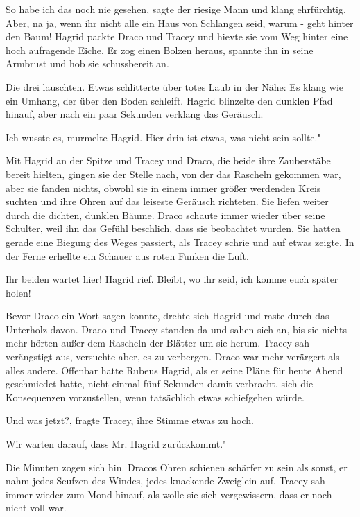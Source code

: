 \glqq So habe ich das noch nie gesehen\grqq{}, sagte der riesige Mann und klang
ehrfürchtig. \glqq Aber, na ja, wenn ihr nicht alle ein Haus von
Schlangen seid, warum - geht hinter den Baum!\grqq{} Hagrid packte Draco
und Tracey und hievte sie vom Weg hinter eine hoch aufragende Eiche. Er
zog einen Bolzen heraus, spannte ihn in seine Armbrust und hob sie
schussbereit an.

Die drei lauschten. Etwas schlitterte über totes Laub in der Nähe: Es klang wie
ein Umhang, der über den Boden schleift. Hagrid blinzelte den dunklen
Pfad hinauf, aber nach ein paar Sekunden verklang das Geräusch.

\glqq Ich wusste es\grqq{}, murmelte Hagrid. \glqq Hier drin ist etwas, was
nicht sein sollte."

Mit Hagrid an der Spitze und Tracey und Draco, die beide ihre Zauberstäbe bereit
hielten, gingen sie der Stelle nach, von der das Rascheln gekommen war,
aber sie fanden nichts, obwohl sie in einem immer größer werdenden Kreis
suchten und ihre Ohren auf das leiseste Geräusch richteten. Sie liefen
weiter durch die dichten, dunklen Bäume. Draco schaute immer wieder über
seine Schulter, weil ihn das Gefühl beschlich, dass sie beobachtet
wurden. Sie hatten gerade eine Biegung des Weges passiert, als Tracey
schrie und auf etwas zeigte. In der Ferne erhellte ein Schauer aus roten
Funken die Luft.

\glqq Ihr beiden wartet hier!\grqq{} Hagrid rief. \glqq Bleibt, wo ihr seid, ich
komme euch später holen!\grqq{}

Bevor Draco ein Wort sagen konnte, drehte sich Hagrid und raste durch das
Unterholz davon. Draco und Tracey standen da und sahen sich an, bis sie
nichts mehr hörten außer dem Rascheln der Blätter um sie herum. Tracey
sah verängstigt aus, versuchte aber, es zu verbergen. Draco war mehr
verärgert als alles andere. Offenbar hatte Rubeus Hagrid, als er seine
Pläne für heute Abend geschmiedet hatte, nicht einmal fünf Sekunden damit
verbracht, sich die Konsequenzen vorzustellen, wenn tatsächlich etwas
schiefgehen würde.

\glqq Und was jetzt?\grqq{}, fragte Tracey, ihre Stimme etwas zu hoch.

\glqq Wir warten darauf, dass Mr. Hagrid zurückkommt."

Die Minuten zogen sich hin. Dracos Ohren schienen schärfer zu sein als sonst, er
nahm jedes Seufzen des Windes, jedes knackende Zweiglein auf. Tracey sah
immer wieder zum Mond hinauf, als wolle sie sich vergewissern, dass er
noch nicht voll war.

